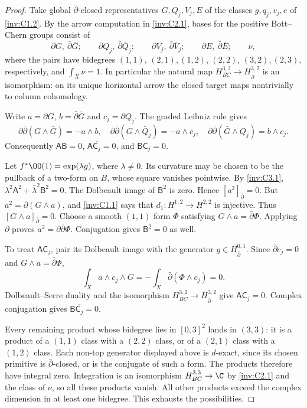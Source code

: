 \begin{proof}
Take global $\bar\partial$-closed representatives $G,Q_j,V_j,E$
of the classes $g,q_j,v_j,e$ of \ref{inv:C1.2}.  By the arrow computation in
\ref{inv:C2.1}, bases for the positive Bott--Chern groups consist of
\[
\partial G,\ \bar\partial\bar G;\qquad
\partial Q_j,\ \bar\partial\bar Q_j;\qquad
\partial V_j,\ \bar\partial\bar V_j;\qquad
\partial E,\ \bar\partial\bar E;\qquad \nu,
\]
where the pairs have bidegrees $(1,1)$, $(2,1),(1,2)$,
$(2,2)$, $(3,2),(2,3)$, respectively, and
$\int_X\nu=1$.  In particular the natural map
$H^{3,2}_{BC}\to H^{3,2}_{\bar\partial}$ is an isomorphism:
on its unique horizontal arrow the closed target maps nontrivially
to column cohomology.

Write $a=\partial G$, $b=\bar\partial\bar G$ and
$c_j=\partial Q_j$.  The graded Leibniz rule gives
\[
\partial\bar\partial(G\wedge\bar G)=-a\wedge b,
\quad
\partial\bar\partial(G\wedge\bar Q_j)
=-a\wedge\bar c_j,
\quad
\partial\bar\partial(\bar G\wedge Q_j)=b\wedge c_j.
\]
Consequently $\mathsf A\mathsf B=0$,
$\mathsf A\overline{\mathsf C_j}=0$, and
$\mathsf B\mathsf C_j=0$.

Let $f^*\OO(1)=\exp(\lambda g)$, where $\lambda\ne0$.
Its curvature may be chosen to be the pullback of a two-form on $B$,
whose square vanishes pointwise.  By \ref{inv:C3.1},
$\lambda^2\mathsf A^2+\bar\lambda^2\mathsf B^2=0$.
The Dolbeault image of $\mathsf B^2$ is zero.  Hence
$[a^2]_{\bar\partial}=0$.  But
$a^2=\partial(G\wedge a)$, and \ref{inv:C1.1} says that
$d_1:H^{1,2}\to H^{2,2}$ is injective.  Thus
$[G\wedge a]_{\bar\partial}=0$.  Choose a smooth $(1,1)$ form
$\Phi$ satisfying $G\wedge a=\bar\partial\Phi$.  Applying
$\partial$ proves $a^2=\partial\bar\partial\Phi$.
Conjugation gives $\mathsf B^2=0$ as well.

To treat $\mathsf A\mathsf C_j$, pair its Dolbeault image with the
generator $g\in H^{0,1}_{\bar\partial}$.  Since
$\bar\partial c_j=0$ and $G\wedge a=\bar\partial\Phi$,
\[
\int_X a\wedge c_j\wedge G
=-\int_X\bar\partial(\Phi\wedge c_j)=0.
\]
Dolbeault--Serre duality and the isomorphism
$H^{3,2}_{BC}\to H^{3,2}_{\bar\partial}$ give
$\mathsf A\mathsf C_j=0$.  Complex conjugation gives
$\mathsf B\overline{\mathsf C_j}=0$.

Every remaining product whose bidegree lies in $[0,3]^2$ lands in
$(3,3)$: it is a product of a $(1,1)$ class with a $(2,2)$ class,
or of a $(2,1)$ class with a $(1,2)$ class.  Each non-top generator
displayed above is $d$-exact, since its chosen primitive is
$\bar\partial$-closed, or is the conjugate of such a form.
The products therefore have integral zero.  Integration is an
isomorphism $H^{3,3}_{BC}\to\C$ by \ref{inv:C2.1} and the class of $\nu$,
so all these products vanish.  All other products exceed the complex
dimension in at least one bidegree.  This exhausts the possibilities.
\end{proof}

